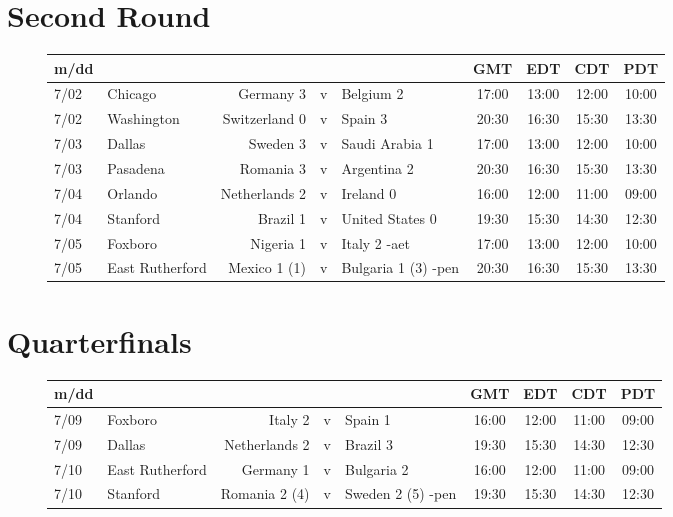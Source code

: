 \section{Second Round}
\begin{figure}[H]

\begin{tabular}{l l r c l c c c c}
m/dd  & & & & & GMT & EDT & CDT & PDT \\ \hline
7/02 & Chicago & Germany 3 & v & Belgium 2 & 17:00 & 13:00 & 12:00 & 10:00 \\
7/02 & Washington & Switzerland 0 & v & Spain 3 & 20:30 &16:30 & 15:30 & 13:30 \\
7/03 & Dallas & Sweden 3 & v & Saudi Arabia 1 & 17:00 & 13:00 & 12:00 & 10:00 \\
7/03 & Pasadena & Romania 3 & v & Argentina 2 & 20:30 &16:30 & 15:30 & 13:30 \\
7/04 & Orlando & Netherlands 2 & v & Ireland 0 & 16:00 & 12:00 & 11:00 & 09:00 \\
7/04 & Stanford & Brazil 1 & v & United States 0 & 19:30 & 15:30 & 14:30 & 12:30 \\
7/05 & Foxboro & Nigeria 1 & v & Italy 2 -aet & 17:00 & 13:00 & 12:00 & 10:00 \\
7/05 & East Rutherford & Mexico 1 (1) & v & Bulgaria 1 (3) -pen & 20:30 &16:30 & 15:30 & 13:30 \\ \hline
\end{tabular}
\end{figure}

\section{Quarterfinals}
\begin{figure}[H]

\begin{tabular}{l l r c l c c c c}
m/dd  & & & & & GMT & EDT & CDT & PDT \\ \hline
7/09 & Foxboro & Italy 2 & v & Spain 1 & 16:00 & 12:00 & 11:00 & 09:00 \\
7/09 & Dallas & Netherlands 2 & v & Brazil 3 & 19:30 & 15:30 & 14:30 & 12:30 \\
7/10 & East Rutherford & Germany 1 & v & Bulgaria 2 & 16:00 & 12:00 & 11:00 & 09:00 \\
7/10 & Stanford & Romania 2 (4) & v & Sweden 2 (5) -pen & 19:30 & 15:30 & 14:30 & 12:30 \\ \hline
\end{tabular}
\end{figure}

